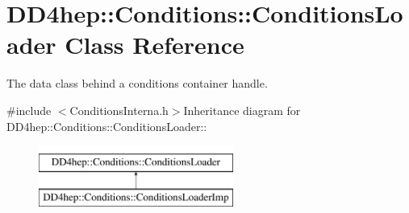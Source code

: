 \hypertarget{class_d_d4hep_1_1_conditions_1_1_conditions_loader}{
\section{DD4hep::Conditions::ConditionsLoader Class Reference}
\label{class_d_d4hep_1_1_conditions_1_1_conditions_loader}
}


The data class behind a conditions container handle.  


{\ttfamily \#include $<$ConditionsInterna.h$>$}Inheritance diagram for DD4hep::Conditions::ConditionsLoader::\begin{figure}[H]
\begin{center}
\leavevmode
\includegraphics[height=2cm]{class_d_d4hep_1_1_conditions_1_1_conditions_loader}
\end{center}
\end{figure}
